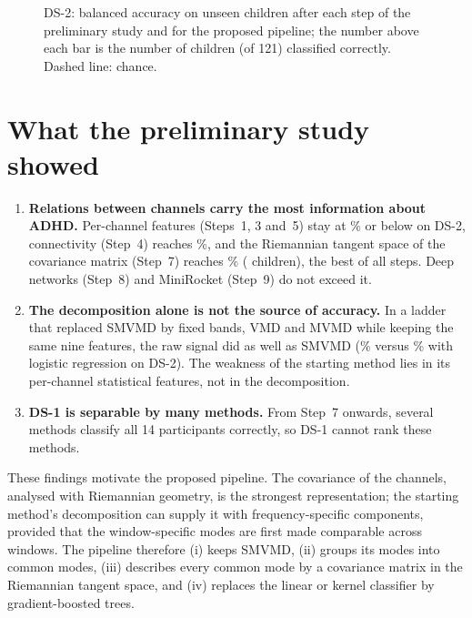 \begin{figure}[H]\centering
{}
\caption{DS-2: balanced accuracy on unseen children after each step of the preliminary study and
for the proposed pipeline; the number above each bar is the number of children (of 121)
classified correctly. Dashed line: chance.}
\label{fig:progression}
\end{figure}

\section{What the preliminary study showed}
\begin{enumerate}
\item \textbf{Relations between channels carry the most information about ADHD.} Per-channel
      features (Steps~1, 3 and~5) stay at \% or below on DS-2, connectivity
      (Step~4) reaches \%, and the Riemannian tangent space of the covariance
      matrix (Step~7) reaches \% ( children), the best of all
      steps. Deep networks (Step~8) and MiniRocket (Step~9) do not exceed it.
\item \textbf{The decomposition alone is not the source of accuracy.} In a ladder that replaced
      SMVMD by fixed bands, VMD and MVMD while keeping the same nine features, the raw signal did
      as well as SMVMD (\% versus \% with logistic
      regression on DS-2). The weakness of the starting method lies in its per-channel
      statistical features, not in the decomposition.
\item \textbf{DS-1 is separable by many methods.} From Step~7 onwards, several methods classify
      all 14 participants correctly, so DS-1 cannot rank these methods.
\end{enumerate}

These findings motivate the proposed pipeline. The covariance of the channels, analysed with
Riemannian geometry, is the strongest representation; the starting method's decomposition can
supply it with frequency-specific components, provided that the window-specific modes are first
made comparable across windows. The pipeline therefore (i) keeps SMVMD, (ii) groups its modes
into common modes, (iii) describes every common mode by a covariance matrix in the Riemannian
tangent space, and (iv) replaces the linear or kernel classifier by gradient-boosted trees.
